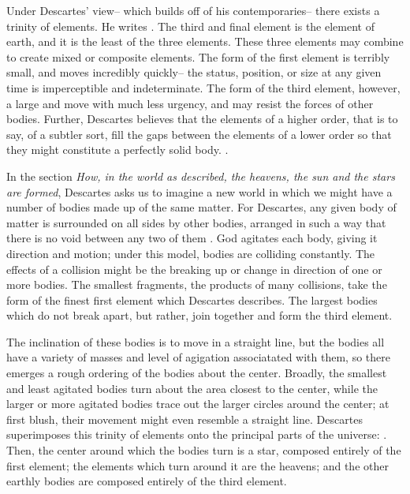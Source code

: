 \documentclass[12pt,twoside]{reedthesis}
\begin{document}
    Under Descartes' view-- which builds off of his contemporaries-- there exists a trinity of elements. He writes \citep[][p. 17]{descartes}. The third and final element is the element of earth, and it is the least  of the three elements. These three elements may combine to create mixed or composite elements. The form of the first element is terribly small, and moves incredibly quickly-- the status, position, or size at any given time is imperceptible and indeterminate. The form of the third element, however, a large and move with much less urgency, and may resist the forces of other bodies. Further, Descartes believes that the elements of a higher order, that is to say, of a subtler sort, fill the gaps between the elements of a lower order so that they might constitute a perfectly solid body.  \citep[][p. 17]{descartes}. \par 

    In the section \emph{How, in the world as described, the heavens, the sun and the stars are formed}, Descartes asks us to imagine a new world in which we might have a number of bodies made up of the same matter. For Descartes, any given body of matter is surrounded on all sides by other bodies, arranged in such a way that there is no void between any two of them \citep[][p. 25]{descartes}. God agitates each body, giving it direction and motion; under this model, bodies are colliding constantly. The effects of a collision might be the breaking up or change in direction of one or more bodies. The smallest fragments, the products of many collisions, take the form of the finest first element which Descartes describes. The largest bodies which do not break apart, but rather, join together and form the third element. \par

    The inclination of these  bodies is to move in a straight line, but the bodies all have a variety of masses and level of agigation associatated with them, so there emerges a rough ordering of the bodies about the center. Broadly, the smallest and least agitated bodies turn about the area closest to the center, while the larger or more agitated bodies trace out the larger circles around the center; at first blush, their movement might even resemble a straight line. Descartes superimposes this trinity of elements onto the principal parts of the universe: \citep[][p. 20]{descartes}. Then, the center around which the bodies turn is a star, composed entirely of the first element; the elements which turn around it are the heavens; and the other earthly bodies are composed entirely of the third element.\par
\end{document}
